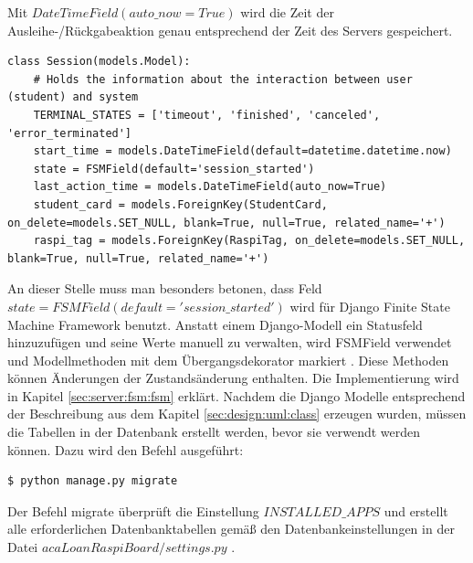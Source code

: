 Mit $DateTimeField(auto\_now=True)$ wird die Zeit der Ausleihe-/Rückgabeaktion genau entsprechend der Zeit des Servers gespeichert. 
\begin{lstlisting}[caption={Session Modell},captionpos=b]
class Session(models.Model):
	# Holds the information about the interaction between user (student) and system
	TERMINAL_STATES = ['timeout', 'finished', 'canceled', 'error_terminated']
	start_time = models.DateTimeField(default=datetime.datetime.now)
	state = FSMField(default='session_started')
	last_action_time = models.DateTimeField(auto_now=True)
	student_card = models.ForeignKey(StudentCard, on_delete=models.SET_NULL, blank=True, null=True, related_name='+')
	raspi_tag = models.ForeignKey(RaspiTag, on_delete=models.SET_NULL, blank=True, null=True, related_name='+')
\end{lstlisting}
An dieser Stelle muss man besonders betonen, dass Feld $state = FSMField(default='session\_started')$ wird für Django Finite State Machine Framework benutzt. Anstatt einem Django-Modell ein Statusfeld hinzuzufügen und seine Werte manuell zu verwalten, wird FSMField verwendet und Modellmethoden mit dem Übergangsdekorator markiert \cite{website:fsm}. Diese Methoden können Änderungen der Zustandsänderung enthalten. Die Implementierung wird in Kapitel \ref{sec:server:fsm:fsm} erklärt. Nachdem die Django Modelle entsprechend der Beschreibung aus dem Kapitel \ref{sec:design:uml:class} erzeugen wurden, müssen die Tabellen in der Datenbank erstellt werden, bevor sie verwendt werden können. Dazu wird den  Befehl ausgeführt:
\begin{lstlisting}[caption={[Der Befehl migrate] },captionpos=b]
$ python manage.py migrate
\end{lstlisting}
Der Befehl migrate überprüft die Einstellung $INSTALLED\_APPS$ und erstellt alle erforderlichen Datenbanktabellen gemäß den Datenbankeinstellungen in der Datei $acaLoanRaspiBoard/settings.py$ \cite{website:15}.

